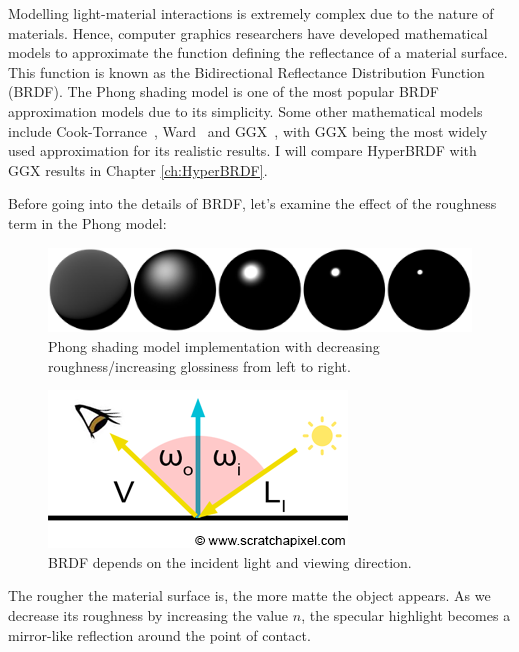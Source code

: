 Modelling light-material interactions is extremely complex due to the nature of materials. Hence, computer graphics researchers have developed mathematical models to approximate the function defining the reflectance of a material surface. This function is known as the Bidirectional Reflectance Distribution Function (\gls{BRDF}). The Phong shading model is one of the most popular BRDF approximation models due to its simplicity. Some other mathematical models include Cook-Torrance~\cite{cooktorrance1982}, Ward~\cite{ward1992} and GGX~\cite{walter2007microfacet}, with GGX being the most widely used approximation for its realistic results. I will compare HyperBRDF with GGX results in Chapter \ref{ch:HyperBRDF}.

Before going into the details of BRDF, let's examine the effect of the roughness term in the Phong model:

\begin{figure}[ht]
  \centering
   \includegraphics[width=\linewidth]{Images/Phong-roughness-coeff.pdf}
   \caption{Phong shading model implementation with decreasing roughness/increasing glossiness from left to right.}
   \label{fig:phong-roughness}
\end{figure}

\begin{figure}
  \centering
   \includegraphics[width=\linewidth]{Images/shad2-brdfdir}
   \caption{BRDF depends on the incident light and viewing direction.}
   \label{fig:brdf}
\end{figure}
The rougher the material surface is, the more matte the object appears. As we decrease its roughness by increasing the value $n$, the specular highlight becomes a mirror-like reflection around the point of contact. 


